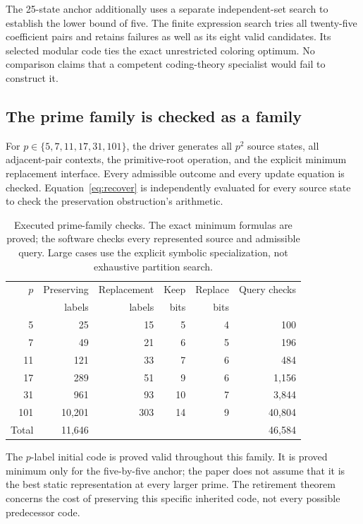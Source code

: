 \documentclass[11pt,letterpaper]{article}
\theoremstyle{remark}\newtheorem{remark}{Remark}[section]
\begin{document}
The 25-state anchor additionally uses a separate independent-set search to establish the lower bound of five. The finite expression search tries all twenty-five coefficient pairs and retains failures as well as its eight valid candidates. Its selected modular code ties the exact unrestricted coloring optimum. No comparison claims that a competent coding-theory specialist would fail to construct it.

\subsection{The prime family is checked as a family}
For $p\in\{5,7,11,17,31,101\}$, the driver generates all $p^2$ source states, all adjacent-pair contexts, the primitive-root operation, and the explicit minimum replacement interface. Every admissible outcome and every update equation is checked. Equation~\eqref{eq:recover} is independently evaluated for every source state to check the preservation obstruction's arithmetic.

\begin{table}[htbp]\centering\small
\caption{Executed prime-family checks. The exact minimum formulas are proved; the software checks every represented source and admissible query. Large cases use the explicit symbolic specialization, not exhaustive partition search.}\label{tab:primes}
\begin{tabular}{@{}rrrrrr@{}}\toprule
$p$ & Preserving & Replacement & Keep & Replace & Query checks\\
 & labels & labels & bits & bits & \\\midrule
5 & 25 & 15 & 5 & 4 & 100\\
7 & 49 & 21 & 6 & 5 & 196\\
11 & 121 & 33 & 7 & 6 & 484\\
17 & 289 & 51 & 9 & 6 & 1,156\\
31 & 961 & 93 & 10 & 7 & 3,844\\
101 & 10,201 & 303 & 14 & 9 & 40,804\\\midrule
Total & 11,646 & & & & 46,584\\\bottomrule
\end{tabular}
\end{table}

The $p$-label initial code is proved valid throughout this family. It is proved minimum only for the five-by-five anchor; the paper does not assume that it is the best static representation at every larger prime. The retirement theorem concerns the cost of preserving this specific inherited code, not every possible predecessor code.
\end{document}
